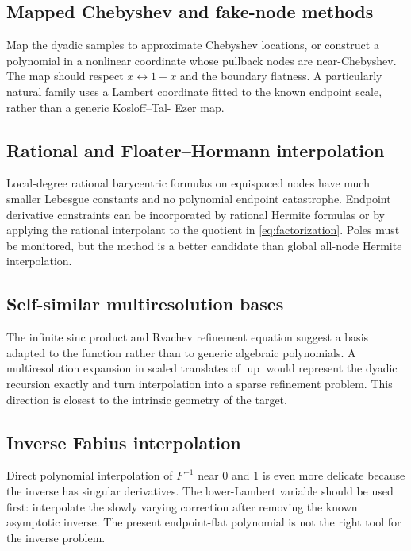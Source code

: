 \documentclass[11pt,oneside]{article}
\numberwithin{equation}{section}
\theoremstyle{definition}
\theoremstyle{remark}
\newcommand{\upf}{\operatorname{up}}
\begin{document}
\subsection{Mapped Chebyshev and fake-node methods}

Map the dyadic samples to approximate Chebyshev locations, or construct a polynomial in a
nonlinear coordinate whose pullback nodes are near-Chebyshev.  The map should respect
$x\leftrightarrow1-x$ and the boundary flatness.  A particularly natural family uses a
Lambert coordinate fitted to the known endpoint scale, rather than a generic Kosloff--Tal-
Ezer map.

\subsection{Rational and Floater--Hormann interpolation}

Local-degree rational barycentric formulas on equispaced nodes have much smaller Lebesgue
constants and no polynomial endpoint catastrophe.  Endpoint derivative constraints can be
incorporated by rational Hermite formulas or by applying the rational interpolant to the
quotient in \eqref{eq:factorization}.  Poles must be monitored, but the method is a better
candidate than global all-node Hermite interpolation.

\subsection{Self-similar multiresolution bases}

The infinite sinc product and Rvachev refinement equation suggest a basis adapted to the
function rather than to generic algebraic polynomials.  A multiresolution expansion in
scaled translates of $\upf$ would represent the dyadic recursion exactly and turn
interpolation into a sparse refinement problem.  This direction is closest to the intrinsic
geometry of the target.

\subsection{Inverse Fabius interpolation}

Direct polynomial interpolation of $F^{-1}$ near $0$ and $1$ is even more delicate because
the inverse has singular derivatives.  The lower-Lambert variable should be used first:
interpolate the slowly varying correction after removing the known asymptotic inverse.  The
present endpoint-flat polynomial is not the right tool for the inverse problem.
\end{document}
